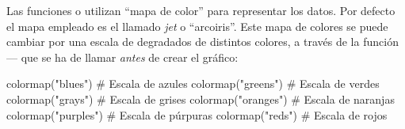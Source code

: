 Las funciones  o  utilizan ``mapa de color'' para representar los datos. Por defecto el mapa empleado es el llamado \emph{jet} o ``arcoiris''. Este mapa de colores se puede cambiar por una escala de degradados de distintos colores, a través de la función  --- que se ha de llamar \emph{antes} de crear el gráfico:

\begin{juliacode}
colormap("blues")   # Escala de azules
colormap("greens")  # Escala de verdes
colormap("grays")   # Escala de grises
colormap("oranges") # Escala de naranjas
colormap("purples") # Escala de púrpuras
colormap("reds")    # Escala de rojos
\end{juliacode}
